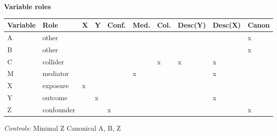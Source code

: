 \begingroup\footnotesize
\setlength{\LTleft}{0pt}\setlength{\LTright}{0pt}
\setlength{\tabcolsep}{4pt}
\renewcommand{\arraystretch}{0.95}
\setlength{\aboverulesep}{0pt}\setlength{\belowrulesep}{0pt}
\noindent\textbf{Variable roles}
\begin{center}
\setlength{\LTleft}{0pt}\setlength{\LTright}{0pt}
\begin{longtable}{@{}l l l l l l l l l l@{}}
\toprule
Variable & Role & X & Y & Conf. & Med. & Col. & Desc(Y) & Desc(X) & Canon \\
\midrule
{A} & {other} &  &  &  &  &  &  &  & {x} \\
{B} & {other} &  &  &  &  &  &  &  & {x} \\
{C} & {collider} &  &  &  &  & {x} & {x} & {x} &  \\
{M} & {mediator} &  &  &  & {x} &  &  & {x} &  \\
{X} & {exposure} & {x} &  &  &  &  &  &  &  \\
{Y} & {outcome} &  & {x} &  &  &  &  & {x} &  \\
{Z} & {confounder} &  &  & {x} &  &  &  &  & {x} \\
\bottomrule
\end{longtable}
\end{center}
\noindent\textit{Controls:} Minimal {Z} \quad Canonical {A, B, Z}

